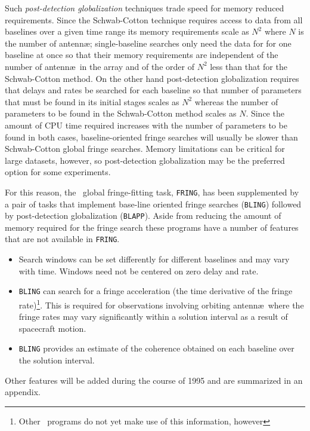 Such {\em post-detection globalization} techniques trade speed for
memory reduced requirements.  Since the Schwab-Cotton technique
requires access to data from all baselines over a given time range its
memory requirements scale as $N^2$ where $N$ is the number of
antenn\ae; single-baseline searches only need the data for for one
baseline at once so that their memory requirements are independent of
the number of antenn\ae\ in the array and of the order of $N^2$ less
than that for the Schwab-Cotton method.  On the other hand
post-detection globalization requires that delays and rates be
searched for each baseline so that number of parameters that must be
found in its initial stages scales as $N^2$ whereas the number of
parameters to be found in the Schwab-Cotton method scales as $N$.
Since the amount of CPU time required increases with the number of
parameters to be found in both cases, baseline-oriented fringe
searches will usually be slower than Schwab-Cotton global fringe
searches.  Memory limitations can be critical for large datasets,
however, so post-detection globalization may be the preferred option
for some experiments.

For this reason, the \AIPS\ global fringe-fitting task, {\tt FRING}, has
been supplemented by a pair of tasks that implement base-line oriented
fringe searches ({\tt BLING}) followed by post-detection globalization
({\tt BLAPP}).  Aside from reducing the amount of memory required for the
fringe search these programs have a number of features that are not
available in {\tt FRING}.
\begin{itemize}
\item Search windows can be set differently for different baselines
and may vary with time.  Windows need not be centered on zero delay
and rate.

\item {\tt BLING} can search for a fringe acceleration (the time derivative
of the fringe rate)\footnote{Other \AIPS\ programs do not yet make use
of this information, however}.  This is required for observations
involving orbiting antenn\ae\ where the fringe rates may vary
significantly within a solution interval as a result of spacecraft
motion.

\item {\tt BLING} provides an estimate of the coherence obtained on each
baseline over the solution interval.
\end{itemize}
Other features will be added during the course of 1995 and are
summarized in an appendix.

